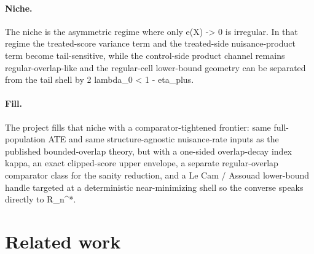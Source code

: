 \documentclass{article}
\begin{document}
\paragraph{Niche.} The niche is the asymmetric regime where only e(X) -> 0 is irregular. In that regime the treated-score variance term and the treated-side nuisance-product term become tail-sensitive, while the control-side product channel remains regular-overlap-like and the regular-cell lower-bound geometry can be separated from the tail shell by 2 lambda_0 < 1 - eta_plus.

\paragraph{Fill.} The project fills that niche with a comparator-tightened frontier: same full-population ATE and same structure-agnostic nuisance-rate inputs as the published bounded-overlap theory, but with a one-sided overlap-decay index kappa, an exact clipped-score upper envelope, a separate regular-overlap comparator class for the sanity reduction, and a Le Cam / Assouad lower-bound handle targeted at a deterministic near-minimizing shell so the converse speaks directly to R_n^*.

\section{Related work}
\end{document}
